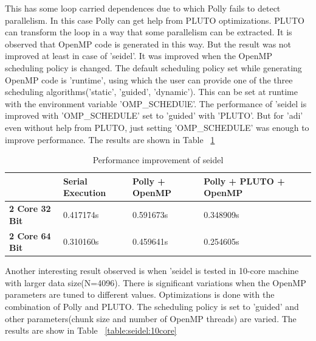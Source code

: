 This has some loop carried dependences due to which Polly fails to detect parallelism. In this case Polly can get help
from PLUTO optimizations. PLUTO can transform the loop in a way that some parallelism can be extracted.
It is observed that OpenMP code is generated in this way. But the result was not improved at least
in case of 'seidel'. It was improved when the OpenMP scheduling policy is changed. The default scheduling
policy set while generating OpenMP code is 'runtime', using which the user can provide
one of the three scheduling algorithms('static', 'guided', 'dynamic'). This can be set
at runtime with the environment variable 'OMP\_SCHEDUlE'. The performance of 'seidel is
improved with 'OMP\_SCHEDULE' set to 'guided' with 'PLUTO'. But for 'adi' even without help from PLUTO, just setting
'OMP\_SCHEDULE' was enough to improve performance. The results are shown in Table ~\ref{table:seidel}

\begin{table}[h]
\begin{center}
{\footnotesize
\begin{tabular}{| l | p{2cm} | p{2cm} | p{2cm} | p{2cm} |}
\hline
& \textbf{Serial Execution} & \textbf{Polly + OpenMP} & \textbf{Polly + PLUTO + OpenMP} \\ \hline
\textbf{2 Core 32 Bit} & 0.417174s & 0.591673s & 0.348909s \\ \hline
\textbf{2 Core 64 Bit} & 0.310160s  &  0.459641s & 0.254605s\\ \hline
\end{tabular}
}
\end{center}
\caption{Performance improvement of seidel}
\label{table:seidel}
\end{table}

Another interesting result observed is when 'seidel is tested in 10-core machine with larger
data size(N=4096). There is significant variations when the OpenMP parameters are tuned to different
values. Optimizations is done with the combination of Polly and PLUTO. The scheduling policy
is set to 'guided' and other parameters(chunk size and number of
OpenMP threads) are varied. The results are show in Table ~\ref{table:seidel:10core}

